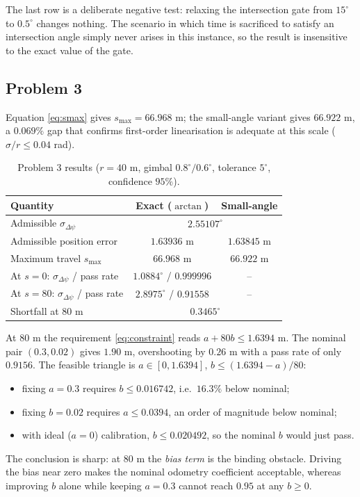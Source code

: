 \documentclass[12pt]{article}
\begin{document}
The last row is a deliberate negative test: relaxing the intersection gate from $15^\circ$ to $0.5^\circ$ changes nothing. The scenario in which time is sacrificed to satisfy an intersection angle simply never arises in this instance, so the result is insensitive to the exact value of the gate.

\subsection{Problem 3}

Equation \eqref{eq:smax} gives $s_{\max}=66.968$ m; the small-angle variant gives $66.922$ m, a $0.069\%$ gap that confirms first-order linearisation is adequate at this scale ($\sigma/r\le0.04$ rad).

\begin{table}[htbp]
  \centering
  \caption{Problem 3 results ($r=40$ m, gimbal $0.8^\circ/0.6^\circ$, tolerance $5^\circ$, confidence $95\%$).}
  \label{tab:q3}
  \small
  \begin{tabular}{lcc}
    \toprule
    Quantity & Exact ($\arctan$) & Small-angle \\
    \midrule
    Admissible $\sigma_{\Delta\psi}$ & \multicolumn{2}{c}{$2.55107^\circ$} \\
    Admissible position error & $1.63936$ m & $1.63845$ m \\
    Maximum travel $s_{\max}$ & $\bm{66.968}$ m & $66.922$ m \\
    \midrule
    At $s=0$: $\sigma_{\Delta\psi}$ / pass rate & $1.0884^\circ$ / $0.999996$ & -- \\
    At $s=80$: $\sigma_{\Delta\psi}$ / pass rate & $2.8975^\circ$ / $0.91558$ & -- \\
    Shortfall at $80$ m & \multicolumn{2}{c}{$0.3465^\circ$} \\
    \bottomrule
  \end{tabular}
\end{table}

At $80$ m the requirement \eqref{eq:constraint} reads $a+80b\le1.6394$ m. The nominal pair $(0.3,0.02)$ gives $1.90$ m, overshooting by $0.26$ m with a pass rate of only $0.9156$. The feasible triangle is $a\in[0,1.6394]$, $b\le(1.6394-a)/80$:
\begin{itemize}[leftmargin=2em]
  \item fixing $a=0.3$ requires $b\le0.016742$, i.e.\ $16.3\%$ below nominal;
  \item fixing $b=0.02$ requires $a\le0.0394$, an order of magnitude below nominal;
  \item with ideal ($a=0$) calibration, $b\le0.020492$, so the nominal $b$ would just pass.
\end{itemize}
The conclusion is sharp: at $80$ m the \emph{bias term} is the binding obstacle. Driving the bias near zero makes the nominal odometry coefficient acceptable, whereas improving $b$ alone while keeping $a=0.3$ cannot reach $0.95$ at any $b\ge0$.
\end{document}
